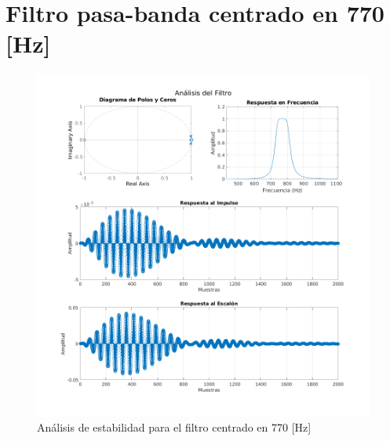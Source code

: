 \section{Filtro pasa-banda centrado en 770 [Hz]}
\begin{figure}[H]
  \centering
  \includegraphics[width=\linewidth]{images/simulacion/770.png}
  \caption{Análisis de estabilidad para el filtro centrado en 770 [Hz]}
  \label{fig:analisis_770}
\end{figure}


